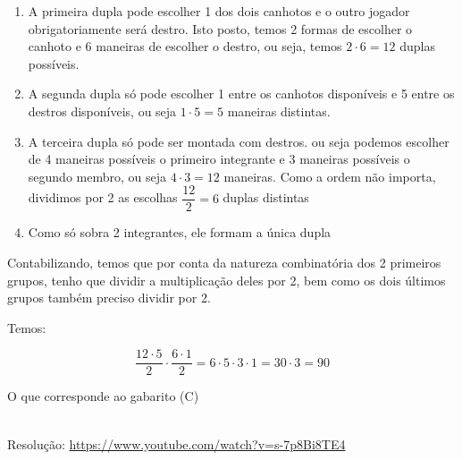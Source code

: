 \begin{enumerate}
    \item A primeira dupla pode escolher 1 dos dois canhotos e o outro jogador obrigatoriamente será destro. Isto posto, temos 2 formas de escolher o canhoto e 6 maneiras de escolher o destro, ou seja, temos $ 2 \cdot 6 = 12 $ duplas possíveis. 
    \item A segunda dupla só pode escolher 1 entre os canhotos disponíveis e 5 entre os destros disponíveis, ou seja $ 1 \cdot 5  = 5 $ maneiras distintas.
    \item A terceira dupla só pode ser montada com destros. ou seja podemos escolher de 4 maneiras possíveis o primeiro integrante e 3 maneiras possíveis o segundo membro, ou seja $ 4 \cdot 3  = 12 $ maneiras. Como a ordem não importa, dividimos por 2 as escolhas $ \dfrac{12}{2} = 6$ duplas distintas
    \item Como só sobra 2 integrantes, ele formam a única dupla
\end{enumerate}

Contabilizando, temos que por conta da natureza combinatória dos 2 primeiros grupos, tenho que dividir a multiplicação deles por 2, bem como os dois últimos grupos também preciso dividir por 2.

Temos:

\[
\dfrac{12 \cdot 5}{2} \cdot \dfrac{6 \cdot 1}{2} = 6 \cdot 5 \cdot 3 \cdot 1 = 30 \cdot 3 = 90
\]

O que corresponde ao gabarito (C)

\begin{center}
    \href{https://www.youtube.com/watch?v=s-7p8Bi8TE4}{
    }\\
    Resolução: \url{https://www.youtube.com/watch?v=s-7p8Bi8TE4}
\end{center}
